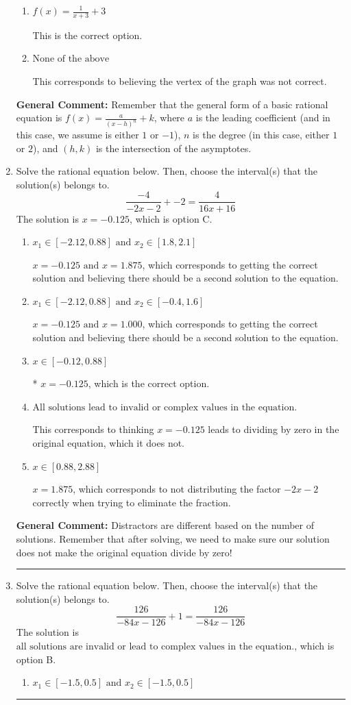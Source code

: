 \documentclass{extbook}[14pt]
\newcommand{\litem}[1]{\item #1

\rule{\textwidth}{0.4pt}}
\begin{document}
\begin{enumerate}
{\begin{enumerate}[label=\Alph*.]
Corresponds to thinking the graph was a shifted version of $\frac{1}{x^2}$.
\item \( f(x) = \frac{1}{x + 3} + 3 \)

This is the correct option.
\item \( \text{None of the above} \)

This corresponds to believing the vertex of the graph was not correct.
\end{enumerate}

\textbf{General Comment:} Remember that the general form of a basic rational equation is $ f(x) = \frac{a}{(x-h)^n} + k$, where $a$ is the leading coefficient (and in this case, we assume is either $1$ or $-1$), $n$ is the degree (in this case, either $1$ or $2$), and $(h, k)$ is the intersection of the asymptotes.
}
\litem{
Solve the rational equation below. Then, choose the interval(s) that the solution(s) belongs to.
\[ \frac{-4}{-2x -2} + -2 = \frac{4}{16x + 16} \]The solution is \( x = -0.125 \), which is option C.\begin{enumerate}[label=\Alph*.]
\item \( x_1 \in [-2.12, 0.88] \text{ and } x_2 \in [1.8,2.1] \)

$x = -0.125 \text{ and } x = 1.875$, which corresponds to getting the correct solution and believing there should be a second solution to the equation.
\item \( x_1 \in [-2.12, 0.88] \text{ and } x_2 \in [-0.4,1.6] \)

$x = -0.125 \text{ and } x = 1.000$, which corresponds to getting the correct solution and believing there should be a second solution to the equation.
\item \( x \in [-0.12,0.88] \)

* $x = -0.125$, which is the correct option.
\item \( \text{All solutions lead to invalid or complex values in the equation.} \)

This corresponds to thinking $x = -0.125$ leads to dividing by zero in the original equation, which it does not.
\item \( x \in [0.88,2.88] \)

$x = 1.875$, which corresponds to not distributing the factor $-2x -2$ correctly when trying to eliminate the fraction.
\end{enumerate}

\textbf{General Comment:} Distractors are different based on the number of solutions. Remember that after solving, we need to make sure our solution does not make the original equation divide by zero!
}
\litem{
Solve the rational equation below. Then, choose the interval(s) that the solution(s) belongs to.
\[ \frac{126}{-84x -126} + 1 = \frac{126}{-84x -126} \]The solution is \( \text{all solutions are invalid or lead to complex values in the equation.} \), which is option B.\begin{enumerate}[label=\Alph*.]
\item \( x_1 \in [-1.5, 0.5] \text{ and } x_2 \in [-1.5,0.5] \)


\end{enumerate}}
\end{enumerate}
\end{document}
